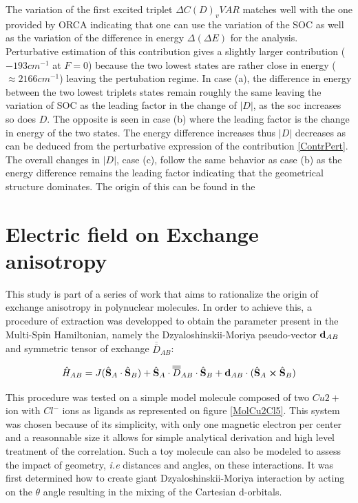 \documentclass[10pt]{report}
\numberwithin{equation}{section}
\begin{document}
The variation of the first excited triplet $\Delta C(D)_v{VAR}$ matches well with the one provided by ORCA indicating that one can use the variation of the SOC as well as the variation of the difference in energy $\Delta (\Delta E)$ for the analysis.
Perturbative estimation of this contribution gives a slightly larger contribution ($-193 cm^{-1}$ at $F=0$) because the two lowest states are rather close in energy ($\approx 2166 cm^{-1}$) leaving the pertubation regime.
In case (a), the difference in energy between the two lowest triplets states remain roughly the same leaving the variation of SOC as the leading factor in the change of $|D|$, as the soc increases so does $D$.
The opposite is seen in case (b) where the leading factor is the change in energy of the two states. 
The energy difference increases thus $|D|$ decreases as can be deduced from the perturbative expression of the contribution \ref{ContrPert}.
The overall changes in $|D|$, case (c), follow the same behavior as case (b) as the energy difference remains the leading factor indicating that the geometrical structure dominates.
The origin of this can be found in the 

\chapter{Electric field on Exchange anisotropy}\label{chap:Cu2Cl5}

This study is part of a series of work that aims to rationalize the origin of exchange anisotropy in polynuclear molecules.
In order to achieve this, a procedure of extraction was developped to obtain the parameter present in the Multi-Spin Hamiltonian, namely the Dzyaloshinskii-Moriya pseudo-vector $\vb{d}_{AB}$ and symmetric tensor of exchange $\overline{\overline{D}}_{AB}$:

\begin{equation}
        \hat{H}_{AB}=J(\hat{\vb S}_A \cdot \hat{\vb S}_B) + \hat{\vb S}_A \cdot\overline{\overline{D}}_{AB} \cdot \hat{\vb S}_B + \vb{d}_{AB} \cdot (\hat{\vb S}_A \cross \hat{\vb S}_B)
\end{equation}

This procedure was tested on a simple model molecule composed of two $Cu{2+}$ ion with $Cl^-$ ions as ligands as represented on figure \ref{MolCu2Cl5}. 
This system was chosen because of its simplicity, with only one magnetic electron per center and a reasonnable size it allows for simple analytical derivation and high level treatment of the correlation.
Such a toy molecule can also be modeled to assess the impact of geometry, \textit{i.e} distances and angles, on these interactions.
It was first determined how to create giant Dzyaloshinskii-Moriya interaction by acting on the $\theta$ angle resulting in the mixing of the Cartesian d-orbitals.
\end{document}
